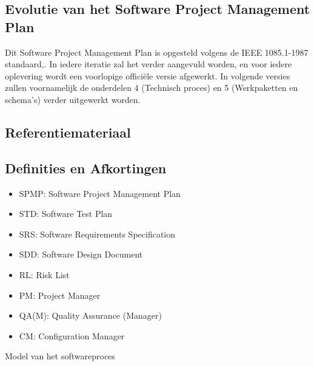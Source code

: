 \documentclass{article}
\begin{document}
\subsection{Evolutie van het Software Project Management Plan}

Dit Software Project Management Plan is opgesteld volgens de IEEE 1085.1-1987 standaard,\citep{website:Cal-Poly}. In iedere iteratie zal het verder aangevuld worden, en voor iedere oplevering wordt een voorlopige  offici\"{e}le versie afgewerkt. In volgende versies zullen voornamelijk de onderdelen 4 (Technisch proces) en 5 (Werkpaketten en schema's) verder uitgewerkt worden.

\clearpage

\subsection{Referentiemateriaal}
\begingroup
\renewcommand{\section}[2]{}%

\endgroup
 
\subsection{Definities en Afkortingen}
\begin{itemize}
\item SPMP: Software Project Management Plan 
\item STD:  Software Test Plan 
\item SRS: Software Requirements Specification 
\item SDD: Software Design Document 
\item RL: Risk List
\item PM: Project Manager
\item QA(M): Quality Assurance (Manager)
\item CM: Configuration Manager
\end{itemize}

 \clearpage


\section{Projectorganisatie}
\subsection{Model van het softwareproces}
\end{document}
